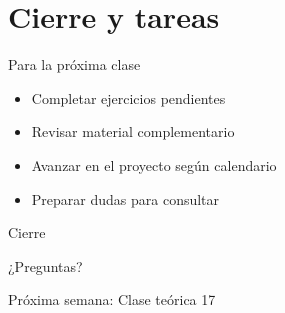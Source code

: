 \documentclass[10pt]{beamer}
\begin{document}
\section{Cierre y tareas}

\begin{frame}{Para la próxima clase}
    \begin{itemize}
        \item Completar ejercicios pendientes
        \item Revisar material complementario
        \item Avanzar en el proyecto según calendario
        \item Preparar dudas para consultar
    \end{itemize}
\end{frame}


\begin{frame}{Cierre}
    \begin{center}
        \Large{¿Preguntas?}
        
        \vspace{1cm}
        
        Próxima semana: Clase teórica 17
    \end{center}
\end{frame}
\end{document}
